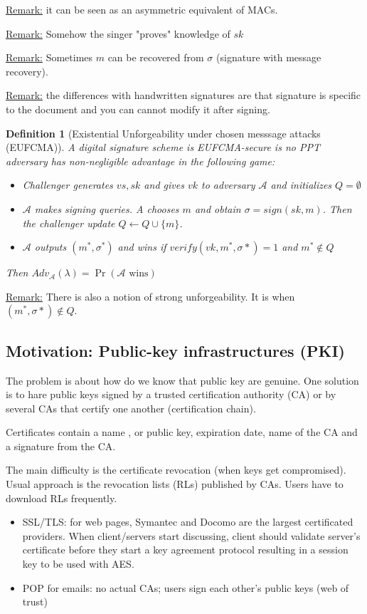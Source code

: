 \documentclass{article}
\newtheorem{defi}[thm]{Definition}
\newcommand{\Def}[3]{\begin{defi}[#1]\label{#2}#3\end{defi}}
\newcommand{\Rem}{\underline{Remark:} }
\newcommand{\A}{\mathcal{A}}
\begin{document}
\Rem it can be seen as an asymmetric equivalent of MACs. 

\Rem Somehow the singer "proves" knowledge of $sk$

\Rem Sometimes $m$ can be recovered from $\sigma$ (signature with message recovery).

\Rem the differences with handwritten signatures are that signature is specific to the document and you can cannot modify it after signing.

\Def{Existential Unforgeability under chosen messsage attacks (EUFCMA)}{def:EUFCMA}{A digital signature scheme is EUFCMA-secure is no PPT adversary has non-negligible advantage in the following game:\begin{itemize}
\item Challenger generates $vs,sk$ and gives $vk$ to adversary $\A$ and initializes $Q=\emptyset$
\item $\A$ makes signing queries. A chooses $m$ and obtain $\sigma=sign(sk,m)$. Then the challenger update $Q\leftarrow Q\cup\{m\}$.
\item $\A$ outputs $(m^*,\sigma^*)$ and wins if $verify(vk,m^*,\sigma*)=1$ and $m^*\notin Q$
\end{itemize}

Then $Adv_\A(\lambda)=\Pr(\A\text{ wins})$}

\Rem There is also a notion of strong unforgeability. It is when $(m^*,\sigma*)\notin Q$.

\subsection{Motivation: Public-key infrastructures (PKI)}
The problem is about how do we know that public key are genuine. One solution is to hare public keys signed by a trusted certification authority (CA) or by several CAs that certify one another (certification chain).

Certificates contain a name , or public key, expiration date, name of the CA and a signature from the CA.

The main difficulty is the certificate revocation (when keys get compromised). Usual approach is the revocation lists (RLs) published by CAs. Users have to download RLs frequently.
\begin{itemize}
\item SSL/TLS: for web pages, Symantec and Docomo are the largest certificated providers. When client/servers start discussing, client should validate server’s certificate before they start a key agreement protocol resulting in a session key to be used with AES.

\item POP for emails: no actual CAs; users sign each other's public keys (web of trust)
\end{itemize}
\end{document}
